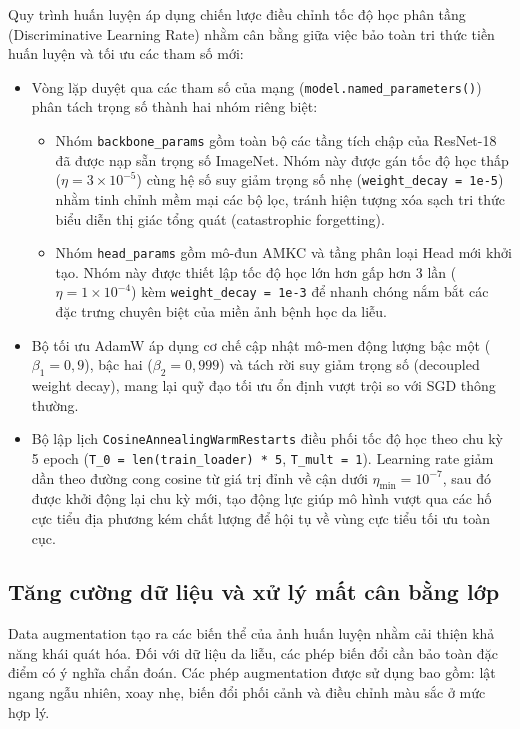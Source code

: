 Quy trình huấn luyện áp dụng chiến lược điều chỉnh tốc độ học phân tầng (Discriminative Learning Rate) nhằm cân bằng giữa việc bảo toàn tri thức tiền huấn luyện và tối ưu các tham số mới:
\begin{itemize}
  \item Vòng lặp duyệt qua các tham số của mạng (\texttt{model.named\_parameters()}) phân tách trọng số thành hai nhóm riêng biệt:
  \begin{itemize}
    \item Nhóm \texttt{backbone\_params} gồm toàn bộ các tầng tích chập của ResNet-18 đã được nạp sẵn trọng số ImageNet. Nhóm này được gán tốc độ học thấp ($\eta = 3\times 10^{-5}$) cùng hệ số suy giảm trọng số nhẹ (\texttt{weight\_decay = 1e-5}) nhằm tinh chỉnh mềm mại các bộ lọc, tránh hiện tượng xóa sạch tri thức biểu diễn thị giác tổng quát (catastrophic forgetting).
    \item Nhóm \texttt{head\_params} gồm mô-đun AMKC và tầng phân loại Head mới khởi tạo. Nhóm này được thiết lập tốc độ học lớn hơn gấp hơn 3 lần ($\eta = 1\times 10^{-4}$) kèm \texttt{weight\_decay = 1e-3} để nhanh chóng nắm bắt các đặc trưng chuyên biệt của miền ảnh bệnh học da liễu.
  \end{itemize}
  \item Bộ tối ưu AdamW áp dụng cơ chế cập nhật mô-men động lượng bậc một ($\beta_1 = 0{,}9$), bậc hai ($\beta_2 = 0{,}999$) và tách rời suy giảm trọng số (decoupled weight decay), mang lại quỹ đạo tối ưu ổn định vượt trội so với SGD thông thường.
  \item Bộ lập lịch \texttt{CosineAnnealingWarmRestarts} điều phối tốc độ học theo chu kỳ 5 epoch (\texttt{T\_0 = len(train\_loader) * 5}, \texttt{T\_mult = 1}). Learning rate giảm dần theo đường cong cosine từ giá trị đỉnh về cận dưới $\eta_{\mathrm{min}} = 10^{-7}$, sau đó được khởi động lại chu kỳ mới, tạo động lực giúp mô hình vượt qua các hố cực tiểu địa phương kém chất lượng để hội tụ về vùng cực tiểu tối ưu toàn cục.
\end{itemize}


\subsection{Tăng cường dữ liệu và xử lý mất cân bằng lớp}

Data augmentation tạo ra các biến thể của ảnh huấn luyện nhằm cải thiện khả năng khái quát hóa. Đối với dữ liệu da liễu, các phép biến đổi cần bảo toàn đặc điểm có ý nghĩa chẩn đoán. Các phép augmentation được sử dụng bao gồm: lật ngang ngẫu nhiên, xoay nhẹ, biến đổi phối cảnh và điều chỉnh màu sắc ở mức hợp lý.

